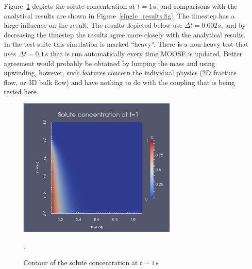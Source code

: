 \documentclass[]{scrreprt}
\begin{document}
Figure~\ref{single_contoured.fig} depicts the solute concentration at
$t=1$\,s, and comparisons with the analytical results are shown in
Figure~\ref{single_results.fig}.  The
timestep has a large influence on the result.  The results depicted
below use $\Delta t = 0.002$\,s, and by decreasing the timestep the
results agree more closely with the analytical results.  In the test
suite this simulation is marked ``heavy''.  There is a non-heavy test
that uses $\Delta t = 0.1$\,s that is run automatically every time
MOOSE is updated.  Better agreement would probably be obtained by
lumping the mass and using upwinding, however, such features concern
the individual physics (2D fracture flow, or 3D bulk flow) and have
nothing to do with the coupling that is being tested here.


\begin{figure}[htb]
\centering
\includegraphics[width=8cm]{single_contoured.eps}
\caption{Contour of the solute concentration at $t=1$\,s}.
\label{single_contoured.fig}
\end{figure}
\end{document}

